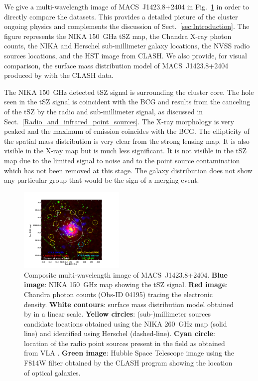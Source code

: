 \documentclass[twocolumn,traditabstract]{aa}
\begin{document}
We give a multi-wavelength image of \mbox{MACS~J1423.8+2404} in Fig.~\ref{fig:MACSJ1424_mutiw} in order to directly compare the datasets. This provides a detailed picture of the cluster ongoing physics and complements the discussion of Sect.~\ref{sec:Introduction}. The figure represents the NIKA 150~GHz tSZ map, the Chandra X-ray photon counts, the NIKA and Herschel sub-millimeter galaxy locations, the NVSS radio sources locations, and the HST image from CLASH. We also provide, for visual comparison, the surface mass distribution model of \mbox{MACS~J1423.8+2404} produced by \cite{zitrin2011} with the CLASH data.

The NIKA 150~GHz detected tSZ signal is surrounding the cluster core. The hole seen in the tSZ signal is coincident with the BCG and results from the canceling of the tSZ by the radio and sub-millimeter signal, as discussed in Sect.~\ref{Radio_and_infrared_point_sources}. The X-ray morphology is very peaked and the maximum of emission coincides with the BCG. The ellipticity of the spatial mass distribution is very clear from the strong lensing map. It is also visible in the X-ray map but is much less significant. It is not visible in the tSZ map due to the limited signal to noise and to the point source contamination which has not been removed at this stage. The galaxy distribution does not show any particular group that would be the sign of a merging event.
\begin{figure}[h]
\centering
\includegraphics[trim=1cm 0cm 5cm 2cm, clip=true, width=0.45\textwidth]{Figure/MACSJ1424_multicolor.pdf}
\caption{Composite multi-wavelength image of \mbox{MACS~J1423.8+2404}. {\bf Blue image}: NIKA 150~GHz map showing the tSZ signal. {\bf Red image}: Chandra photon counts (Obs-ID 04195) tracing the electronic density. {\bf White contours}: surface mass distribution model obtained by \cite{zitrin2011} in a linear scale. {\bf Yellow circles}: (sub-)millimeter sources candidate locations obtained using the NIKA 260~GHz map (solid line) and identified using Herschel (dashed-line). {\bf Cyan circle}: location of the radio point sources present in the field as obtained from VLA \citep{laroque2003}. {\bf Green image}: Hubble Space Telescope image using the F814W filter obtained by the CLASH  program \citep{postman2012} showing the location of optical galaxies.}
\label{fig:MACSJ1424_mutiw}
\end{figure}
\end{document}
